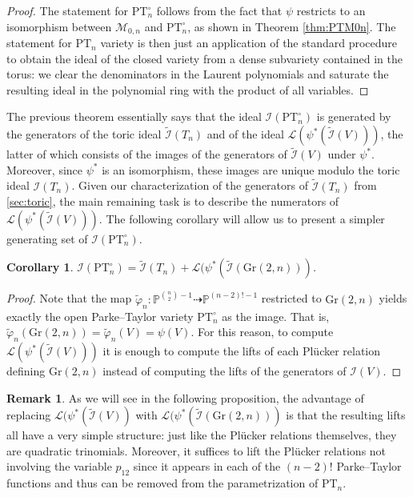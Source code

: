 \documentclass[12pt, reqno]{amsart}
\numberwithin{equation}{section}
\theoremstyle{plain}
\newtheorem{corollary}[theorem]{Corollary}
\theoremstyle{definition}
\newtheorem{remark}[theorem]{Remark}
\newcommand{\ci}{\mathcal{I}}
\newcommand{\pt}{\mathrm{PT}}
\newcommand{\gr}{\mathrm{Gr}}
\begin{document}
\begin{proof}
    The statement for $\pt^\circ_n$ follows from the fact that $\psi$ restricts to an isomorphism between $\mathcal{M}_{0,n}$ and $\mathrm{PT}^\circ_n$, as shown in Theorem \ref{thm:PTM0n}. The statement for $\pt_n$ variety is then just an application of the standard procedure to obtain the ideal of the closed variety from a dense subvariety contained in the torus: we clear the denominators in the Laurent polynomials and saturate the resulting ideal in the polynomial ring with the product of all variables. 
\end{proof}

The previous theorem essentially says that the ideal $\ci(\mathrm{PT}_n^\circ)$ is generated by the generators of the toric ideal $\tilde{\ci}(T_n)$ and of the ideal $\mathcal{L}(\psi^\ast(\tilde{\ci}(V)))$, the latter of which consists of the images of the generators of $\tilde{\ci}(V)$ under $\psi^\ast$. Moreover, since $\psi^\ast$ is an isomorphism, these images are unique modulo the toric ideal $\ci(T_n)$. Given our characterization of the generators of $\tilde{\ci}(T_n)$ from \cref{sec:toric}, the main remaining task is to describe the numerators of $\mathcal{L}(\psi^\ast(\tilde{\ci}(V)))$. The following corollary will allow us to present a simpler generating set of $\ci(\pt_n^\circ)$. 

\begin{corollary}\label{cor:just-lift-pluckers}
$\ci(\pt_n^\circ) = \tilde{\ci}(T_n) + \mathcal{L}(\psi^\ast(\tilde{\ci}(\gr(2,n)))$.
\end{corollary}
\begin{proof}
Note that the map $\tilde{\varphi}_n:\mathbb{P}^{\binom{n}{2}-1}\dashrightarrow \mathbb{P}^{(n-2)!-1}$ restricted to $\mathrm{Gr}(2,n)$ yields exactly the open Parke--Taylor variety $\mathrm{PT}^\circ_n$ as the image. That is, $\tilde{\varphi}_n(\mathrm{Gr}(2,n))=\tilde{\varphi}_n(V)=\psi(V)$. For this reason, to compute $\mathcal{L}(\psi^*(\tilde{\mathcal{I}}(V)))$ it is enough to compute the lifts of each Pl\"ucker relation defining $\mathrm{Gr}(2,n)$ instead of computing the lifts of the generators of $\mathcal{I}(V)$.
\end{proof}

\begin{remark} \label{rem:gr}
As we will see in the following proposition, the advantage of replacing $\mathcal{L}(\psi^\ast(\tilde{\ci}(V))$ with $\mathcal{L}(\psi^\ast(\tilde{\ci}(\gr(2,n)))$ is that the resulting lifts all have a very simple structure: just like the Pl\"ucker relations themselves, they are quadratic trinomials. Moreover, it suffices to lift the Pl\"ucker relations not involving the variable $p_{12}$ since it appears in each of the $(n-2)!$ Parke--Taylor functions and thus can be removed from the parametrization of $\pt_n$.
\end{remark}
\end{document}
